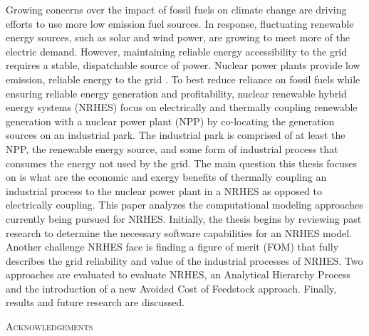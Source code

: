 \documentclass[12pt]{UIdahoMastersThesis}
\begin{document}
Growing concerns over the impact of fossil fuels on climate change are driving efforts to use more low emission fuel sources. In response, fluctuating renewable energy sources, such as solar and wind power, are growing to meet more of the electric demand. However, maintaining reliable energy accessibility to the grid requires a stable, dispatchable source of power. Nuclear power plants provide low emission, reliable energy to the grid \cite{IPCC}. To best reduce reliance on fossil fuels while ensuring reliable energy generation and profitability, nuclear renewable hybrid energy systems (NRHES) focus on electrically and thermally coupling renewable generation with a nuclear power plant (NPP) by co-locating the generation sources on an industrial park. The industrial park is comprised of at least the NPP, the renewable energy source, and some form of industrial process that consumes the energy not used by the grid. The main question this thesis focuses on is what are the economic and exergy benefits of thermally coupling an industrial process to the nuclear power plant in a NRHES as opposed to electrically coupling. This paper analyzes the computational modeling approaches currently being pursued for NRHES. Initially, the thesis begins by reviewing past research to determine the necessary software capabilities for an NRHES model. Another challenge NRHES face is finding a figure of merit (FOM) that fully describes the grid reliability and value of the industrial processes of NRHES. Two approaches are evaluated to evaluate NRHES, an Analytical Hierarchy Process and the introduction of a new Avoided Cost of Feedstock approach.  Finally, results and future research are discussed.

\newpage


 \begin{center}
 	{\LARGE\textsc{Acknowledgements}}
 \end{center}


\newpage




\end{document}
